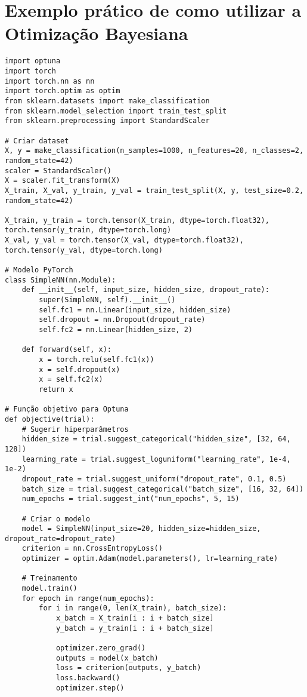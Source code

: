 \documentclass{article}
\begin{document}
\section{Exemplo prático de como utilizar a Otimização Bayesiana}
\begin{verbatim}
import optuna
import torch
import torch.nn as nn
import torch.optim as optim
from sklearn.datasets import make_classification
from sklearn.model_selection import train_test_split
from sklearn.preprocessing import StandardScaler

# Criar dataset
X, y = make_classification(n_samples=1000, n_features=20, n_classes=2, random_state=42)
scaler = StandardScaler()
X = scaler.fit_transform(X)
X_train, X_val, y_train, y_val = train_test_split(X, y, test_size=0.2, random_state=42)

X_train, y_train = torch.tensor(X_train, dtype=torch.float32), torch.tensor(y_train, dtype=torch.long)
X_val, y_val = torch.tensor(X_val, dtype=torch.float32), torch.tensor(y_val, dtype=torch.long)

# Modelo PyTorch
class SimpleNN(nn.Module):
    def __init__(self, input_size, hidden_size, dropout_rate):
        super(SimpleNN, self).__init__()
        self.fc1 = nn.Linear(input_size, hidden_size)
        self.dropout = nn.Dropout(dropout_rate)
        self.fc2 = nn.Linear(hidden_size, 2)

    def forward(self, x):
        x = torch.relu(self.fc1(x))
        x = self.dropout(x)
        x = self.fc2(x)
        return x

# Função objetivo para Optuna
def objective(trial):
    # Sugerir hiperparâmetros
    hidden_size = trial.suggest_categorical("hidden_size", [32, 64, 128])
    learning_rate = trial.suggest_loguniform("learning_rate", 1e-4, 1e-2)
    dropout_rate = trial.suggest_uniform("dropout_rate", 0.1, 0.5)
    batch_size = trial.suggest_categorical("batch_size", [16, 32, 64])
    num_epochs = trial.suggest_int("num_epochs", 5, 15)

    # Criar o modelo
    model = SimpleNN(input_size=20, hidden_size=hidden_size, dropout_rate=dropout_rate)
    criterion = nn.CrossEntropyLoss()
    optimizer = optim.Adam(model.parameters(), lr=learning_rate)

    # Treinamento
    model.train()
    for epoch in range(num_epochs):
        for i in range(0, len(X_train), batch_size):
            x_batch = X_train[i : i + batch_size]
            y_batch = y_train[i : i + batch_size]

            optimizer.zero_grad()
            outputs = model(x_batch)
            loss = criterion(outputs, y_batch)
            loss.backward()
            optimizer.step()


\end{verbatim}
\end{document}
